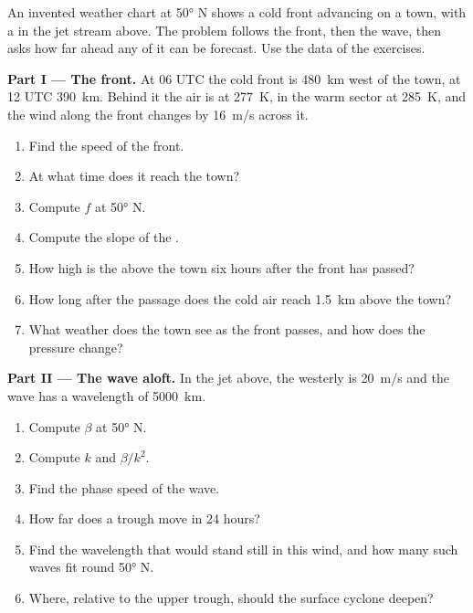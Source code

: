 \begin{problem}\label{pb:b2:weather-systems:1}
An invented weather chart at \ang{50} N shows a cold front advancing on a town, with a  in the jet stream above. The problem follows the front, then the wave, then asks how far
ahead any of it can be forecast. Use the data of the exercises.

\medskip\noindent\textbf{Part I --- The front.}
At 06 UTC the cold front is \qty{480}{km} west of the town, at 12 UTC \qty{390}{km}. Behind it
the air is at \qty{277}{K}, in the warm sector at \qty{285}{K}, and the wind along the front
changes by \qty{16}{m/s} across it.
\begin{enumerate}
  \item Find the speed of the front.
  \item At what time does it reach the town?
  \item Compute $f$ at \ang{50} N.
  \item Compute the slope of the .
  \item How high is the  above the town six hours after the front has passed?
  \item How long after the passage does the cold air reach \qty{1.5}{km} above the town?
  \item What weather does the town see as the front passes, and how does the pressure change?
\end{enumerate}

\medskip\noindent\textbf{Part II --- The wave aloft.}
In the jet above, the westerly is \qty{20}{m/s} and the wave has a wavelength of \qty{5000}{km}.
\begin{enumerate}[resume]
  \item Compute $\beta$ at \ang{50} N.
  \item Compute $k$ and $\beta/k^2$.
  \item Find the phase speed of the wave.
  \item How far does a trough move in 24 hours?
  \item Find the wavelength that would stand still in this wind, and how many such waves fit
        round \ang{50} N.
  \item Where, relative to the upper trough, should the surface cyclone deepen?
\end{enumerate}


\end{problem}
